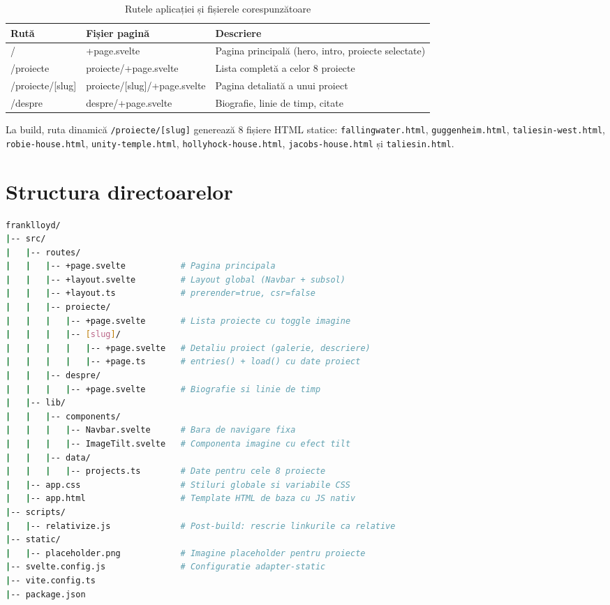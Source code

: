 \documentclass[12pt,a4paper]{report}
\begin{document}
\begin{table}[H]
  \centering
  \caption{Rutele aplicației și fișierele corespunzătoare}
  \label{tab:routes}
  \begin{tabularx}{\textwidth}{>{\ttfamily}l >{\ttfamily}l X}
    \toprule
    \textbf{Rută} & \textbf{Fișier pagină} & \textbf{Descriere} \\
    \midrule
    /                    & +page.svelte              & Pagina principală (hero, intro, proiecte selectate) \\
    /proiecte            & proiecte/+page.svelte     & Lista completă a celor 8 proiecte \\
    /proiecte/[slug]     & proiecte/[slug]/+page.svelte & Pagina detaliată a unui proiect \\
    /despre              & despre/+page.svelte       & Biografie, linie de timp, citate \\
    \bottomrule
  \end{tabularx}
\end{table}

La build, ruta dinamică \texttt{/proiecte/[slug]} generează 8 fișiere HTML
statice: \texttt{fallingwater.html}, \texttt{guggenheim.html},
\texttt{taliesin-west.html}, \texttt{robie-house.html},
\texttt{unity-temple.html}, \texttt{hollyhock-house.html},
\texttt{jacobs-house.html} și \texttt{taliesin.html}.

\section{Structura directoarelor}

\begin{lstlisting}[language=bash,
  caption={Structura proiectului franklloyd/}]
franklloyd/
|-- src/
|   |-- routes/
|   |   |-- +page.svelte           # Pagina principala
|   |   |-- +layout.svelte         # Layout global (Navbar + subsol)
|   |   |-- +layout.ts             # prerender=true, csr=false
|   |   |-- proiecte/
|   |   |   |-- +page.svelte       # Lista proiecte cu toggle imagine
|   |   |   |-- [slug]/
|   |   |   |   |-- +page.svelte   # Detaliu proiect (galerie, descriere)
|   |   |   |   |-- +page.ts       # entries() + load() cu date proiect
|   |   |-- despre/
|   |   |   |-- +page.svelte       # Biografie si linie de timp
|   |-- lib/
|   |   |-- components/
|   |   |   |-- Navbar.svelte      # Bara de navigare fixa
|   |   |   |-- ImageTilt.svelte   # Componenta imagine cu efect tilt
|   |   |-- data/
|   |   |   |-- projects.ts        # Date pentru cele 8 proiecte
|   |-- app.css                    # Stiluri globale si variabile CSS
|   |-- app.html                   # Template HTML de baza cu JS nativ
|-- scripts/
|   |-- relativize.js              # Post-build: rescrie linkurile ca relative
|-- static/
|   |-- placeholder.png            # Imagine placeholder pentru proiecte
|-- svelte.config.js               # Configuratie adapter-static
|-- vite.config.ts
|-- package.json
\end{lstlisting}
\end{document}
